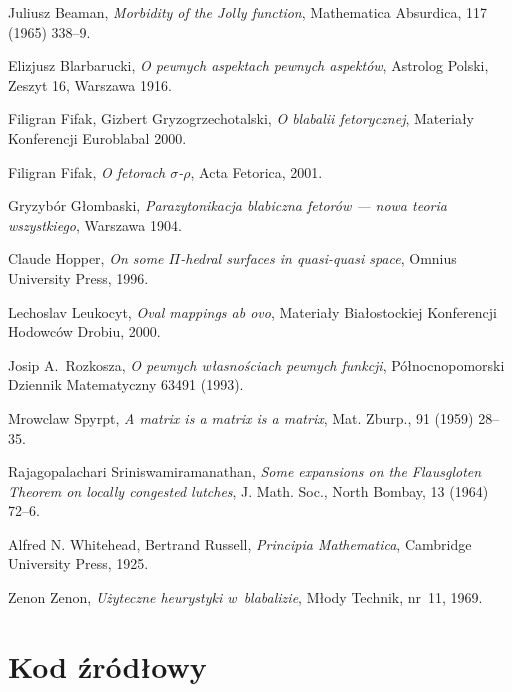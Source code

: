 \documentclass[licencjacka]{pracamgr}
\begin{document}
\begin{thebibliography}{99}

 Juliusz Beaman, \textit{Morbidity of the Jolly
    function}, Mathematica Absurdica, 117 (1965) 338--9.

 Elizjusz Blarbarucki, \textit{O pewnych
    aspektach pewnych aspektów}, Astrolog Polski, Zeszyt 16, Warszawa
  1916.

 Filigran Fifak, Gizbert Gryzogrzechotalski,
  \textit{O blabalii fetorycznej}, Materiały Konferencji Euroblabal
  2000.

 Filigran Fifak, \textit{O fetorach
    $\sigma$-$\rho$}, Acta Fetorica, 2001.

 Gryzybór Głombaski, \textit{Parazytonikacja
    blabiczna fetorów --- nowa teoria wszystkiego}, Warszawa 1904.

 Claude Hopper, \textit{On some $\Pi$-hedral
    surfaces in quasi-quasi space}, Omnius University Press, 1996.

 Lechoslav Leukocyt, \textit{Oval mappings ab ovo},
  Materiały Białostockiej Konferencji Hodowców Drobiu, 2000.

 Josip A.~Rozkosza, \textit{O pewnych własnościach
    pewnych funkcji}, Północnopomorski Dziennik Matematyczny 63491
  (1993).

 Mrowclaw Spyrpt, \textit{A matrix is a matrix
    is a matrix}, Mat. Zburp., 91 (1959) 28--35.

 Rajagopalachari Sriniswamiramanathan,
  \textit{Some expansions on the Flausgloten Theorem on locally
    congested lutches}, J. Math.  Soc., North Bombay, 13 (1964) 72--6.

 Alfred N. Whitehead, Bertrand Russell,
  \textit{Principia Mathematica}, Cambridge University Press, 1925.

 Zenon Zenon, \textit{Użyteczne heurystyki
    w~blabalizie}, Młody Technik, nr~11, 1969.

\end{thebibliography}

\chapter*{Kod źródłowy}
\end{document}
